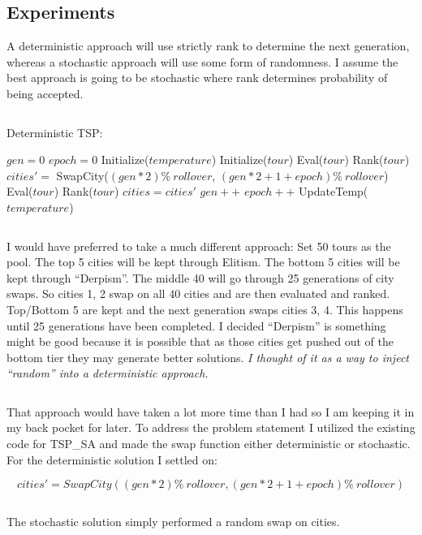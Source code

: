 \documentclass[12pt]{article}
\begin{document}
\subsection{Experiments}
A deterministic approach will use strictly rank to determine the next 
generation, whereas a stochastic approach will use some form of randomness. I 
assume the best approach is going to be stochastic where rank determines 
probability of being accepted.

$$$$


Deterministic TSP:
\begin{algorithmic}
\STATE $gen = 0$
\STATE $epoch = 0$
\STATE Initialize($temperature$)
\STATE Initialize($tour$)
\STATE Eval($tour$)
\STATE Rank($tour$)
\STATE   $cities' = $ SwapCity($(gen * 2) \%\ rollover$, $(gen * 2 + 1 + epoch)\%\ rollover$)
\STATE   Eval($tour$)
\STATE   Rank($tour$)
\STATE     $cities = cities'$
\ENDIF
\STATE   $gen++$
\STATE     $epoch++$
\ENDIF
\STATE   UpdateTemp($temperature$)
\ENDWHILE
\end{algorithmic}

$$$$

I would have preferred to take a much different approach:
Set 50 tours as the pool. The top 5 cities will be kept through 
Elitism. The bottom 5 cities will be kept through ``Derpism''. The middle 40 
will go through 25 generations of city swaps. So cities 1, 2 swap on all 40 
cities and are then evaluated and ranked. Top/Bottom 5 are kept and the next 
generation swaps cities 3, 4. This happens until 25 generations have been 
completed. I decided ``Derpism'' is something might be good because it is possible 
that as those cities get pushed out of the bottom tier they may generate better 
solutions. \textit{I thought of it as a way to inject ``random'' into a 
deterministic approach.}

$$$$

That approach would have taken a lot more time than I had so I am keeping it in 
my back pocket for later. To address the problem statement I utilized the 
existing code for TSP\_SA and made the swap function either deterministic or 
stochastic. For the deterministic solution I settled on:

$$cities' = SwapCity((gen * 2) \%\ rollover, (gen * 2 + 1 + epoch)\%\ rollover)$$

$$$$

The stochastic solution simply performed a random swap on cities. 
\end{document}

